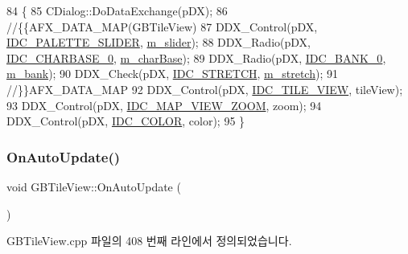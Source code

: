\begin{DoxyCode}
84 \{
85   CDialog::DoDataExchange(pDX);
86   \textcolor{comment}{//\{\{AFX\_DATA\_MAP(GBTileView)}
87   DDX\_Control(pDX, \mbox{\hyperlink{resource_8h_ae398a4a3d20d01692ce6aa2e9ad41c76}{IDC\_PALETTE\_SLIDER}}, \mbox{\hyperlink{class_g_b_tile_view_ace72ce81e68876fe62cb85b09405e296}{m\_slider}});
88   DDX\_Radio(pDX, \mbox{\hyperlink{resource_8h_ae2dd08d4db99bfdb3e6aa9513a5e0790}{IDC\_CHARBASE\_0}}, \mbox{\hyperlink{class_g_b_tile_view_a0ad19c822952ef98ced0a46d051cb87e}{m\_charBase}});
89   DDX\_Radio(pDX, \mbox{\hyperlink{resource_8h_a190a3b55c16d4bfa4df4bc4334a82568}{IDC\_BANK\_0}}, \mbox{\hyperlink{class_g_b_tile_view_a765264072397d9630d2f3ae8e58c414e}{m\_bank}});
90   DDX\_Check(pDX, \mbox{\hyperlink{resource_8h_a639d2318d8892c6f42b323500aae50f0}{IDC\_STRETCH}}, \mbox{\hyperlink{class_g_b_tile_view_afaaee0263ecf447f8c628d0bbf1ff76f}{m\_stretch}});
91   \textcolor{comment}{//\}\}AFX\_DATA\_MAP}
92   DDX\_Control(pDX, \mbox{\hyperlink{resource_8h_a091df1e8af92b702472240d05fafd9cc}{IDC\_TILE\_VIEW}}, tileView);
93   DDX\_Control(pDX, \mbox{\hyperlink{resource_8h_a623597a58dcab206815a2c2fc7de0d91}{IDC\_MAP\_VIEW\_ZOOM}}, zoom);
94   DDX\_Control(pDX, \mbox{\hyperlink{resource_8h_a611975b03b6d7ce68b2de260b97086d0}{IDC\_COLOR}}, color);
95 \}
\end{DoxyCode}
\mbox{\label{class_g_b_tile_view_ad31fb32f27279e00c296717013144d33}} 
\subsubsection{\texorpdfstring{On\+Auto\+Update()}{OnAutoUpdate()}}
{\footnotesize\ttfamily void G\+B\+Tile\+View\+::\+On\+Auto\+Update (\begin{DoxyParamCaption}{ }\end{DoxyParamCaption})\hspace{0.3cm}{\ttfamily [protected]}}



G\+B\+Tile\+View.\+cpp 파일의 408 번째 라인에서 정의되었습니다.


